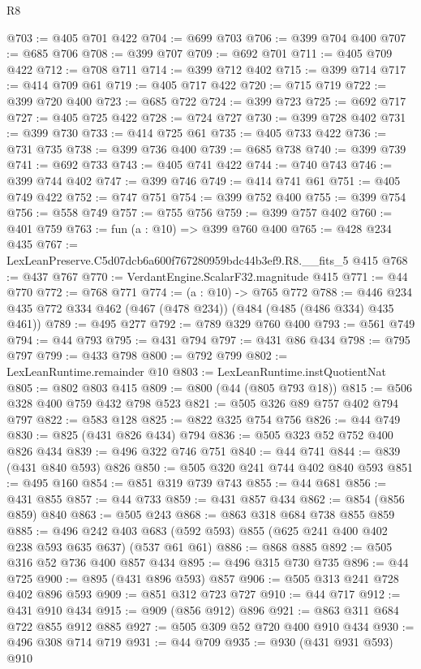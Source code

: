 \begin{lexlean}{R8}
\begin{coremodule}
@703 := @405 @701 @422
@704 := @699 @703
@706 := @399 @704 @400
@707 := @685 @706
@708 := @399 @707
@709 := @692 @701
@711 := @405 @709 @422
@712 := @708 @711
@714 := @399 @712 @402
@715 := @399 @714
@717 := @414 @709 @61
@719 := @405 @717 @422
@720 := @715 @719
@722 := @399 @720 @400
@723 := @685 @722
@724 := @399 @723
@725 := @692 @717
@727 := @405 @725 @422
@728 := @724 @727
@730 := @399 @728 @402
@731 := @399 @730
@733 := @414 @725 @61
@735 := @405 @733 @422
@736 := @731 @735
@738 := @399 @736 @400
@739 := @685 @738
@740 := @399 @739
@741 := @692 @733
@743 := @405 @741 @422
@744 := @740 @743
@746 := @399 @744 @402
@747 := @399 @746
@749 := @414 @741 @61
@751 := @405 @749 @422
@752 := @747 @751
@754 := @399 @752 @400
@755 := @399 @754
@756 := @558 @749
@757 := @755 @756
@759 := @399 @757 @402
@760 := @401 @759
@763 := fun (a : @10) => @399 @760 @400
@765 := @428 @234 @435
@767 := LexLeanPreserve.C5d07dcb6a600f767280959bdc44b3ef9.R8.__fits_5 @415
@768 := @437 @767
@770 := VerdantEngine.ScalarF32.magnitude @415
@771 := @44 @770
@772 := @768 @771
@774 := (a : @10) -> @765 @772
@788 := @446 @234 @435 @772 @334 @462 (@467 (@478 @234)) (@484 (@485 (@486 @334) @435 @461))
@789 := @495 @277
@792 := @789 @329 @760 @400
@793 := @561 @749
@794 := @44 @793
@795 := @431 @794
@797 := @431 @86 @434
@798 := @795 @797
@799 := @433 @798
@800 := @792 @799
@802 := LexLeanRuntime.remainder @10
@803 := LexLeanRuntime.instQuotientNat
@805 := @802 @803 @415
@809 := @800 (@44 (@805 @793 @18))
@815 := @506 @328 @400 @759 @432 @798 @523
@821 := @505 @326 @89 @757 @402 @794 @797
@822 := @583 @128
@825 := @822 @325 @754 @756
@826 := @44 @749
@830 := @825 (@431 @826 @434) @794
@836 := @505 @323 @52 @752 @400 @826 @434
@839 := @496 @322 @746 @751
@840 := @44 @741
@844 := @839 (@431 @840 @593) @826
@850 := @505 @320 @241 @744 @402 @840 @593
@851 := @495 @160
@854 := @851 @319 @739 @743
@855 := @44 @681
@856 := @431 @855
@857 := @44 @733
@859 := @431 @857 @434
@862 := @854 (@856 @859) @840
@863 := @505 @243
@868 := @863 @318 @684 @738 @855 @859
@885 := @496
    @242
    @403
    @683
    (@592 @593)
    @855
    (@625 @241 @400 @402 @238 @593 @635 @637)
    (@537 @61 @61)
@886 := @868 @885
@892 := @505 @316 @52 @736 @400 @857 @434
@895 := @496 @315 @730 @735
@896 := @44 @725
@900 := @895 (@431 @896 @593) @857
@906 := @505 @313 @241 @728 @402 @896 @593
@909 := @851 @312 @723 @727
@910 := @44 @717
@912 := @431 @910 @434
@915 := @909 (@856 @912) @896
@921 := @863 @311 @684 @722 @855 @912 @885
@927 := @505 @309 @52 @720 @400 @910 @434
@930 := @496 @308 @714 @719
@931 := @44 @709
@935 := @930 (@431 @931 @593) @910

\end{coremodule}
\end{lexlean}
